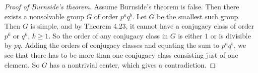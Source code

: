 \begin{proof}[Proof of Burnside's theorem]
Assume Burnside's theorem is false. Then there exists a nonsolvable group $G$ of order $p^aq^b$. Let $G$ be the smallest such group. Then $G$ is simple, and by Theorem 4.23, it cannot have a conjugacy class of order $p^k$ or $q^k$, $k\geq1$. So the order of any conjugacy class in $G$ is either $1$ or is divisible by $pq$. Adding the orders of conjugacy classes and equating the sum to $p^aq^b$, we see that there has to be more than one conjugacy class consisting just of one element. So $G$ has a nontrivial center, which gives a contradiction.
\end{proof}
